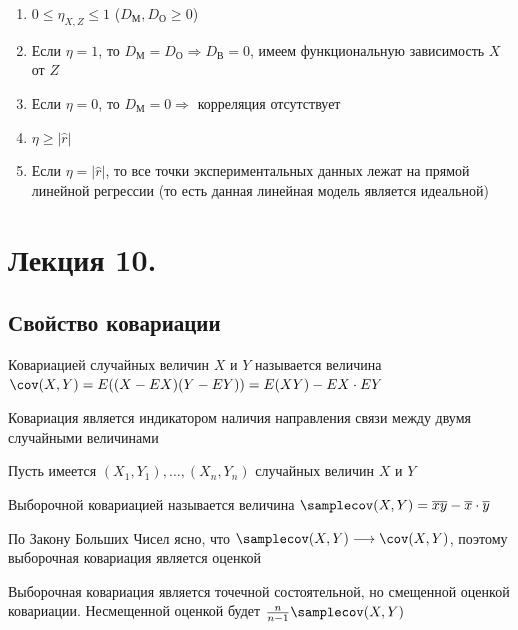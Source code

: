 \documentclass[12pt]{article}
\begin{document}
\begin{enumerate}
    \item $0 \leq \eta_{X, Z} \leq 1$ ($D_\text{М}, D_\text{О} \geq 0$)

    \item Если $\eta = 1$, то $D_\text{М} = D_\text{О} \Longrightarrow D_\text{В} = 0$, имеем функциональную зависимость $X$ от $Z$

    \item Если $\eta = 0$, то $D_\text{М} = 0 \Longrightarrow$ корреляция отсутствует

    \item $\eta \geq |\hat r|$

    \item Если $\eta = |\hat r|$, то все точки экспериментальных данных лежат на прямой линейной регрессии 
    (то есть данная линейная модель является идеальной)

\end{enumerate}







\section{Лекция 10.}

\subsection{Свойство ковариации}

\Mem Ковариацией случайных величин $X$ и $Y$ называется величина $\cov (X, Y) = E((X - EX)(Y - EY)) = E(XY) - EX \cdot EY$

Ковариация является индикатором наличия направления связи между двумя случайными величинами

Пусть имеется $(X_1, Y_1), \dots, (X_n, Y_n)$ случайных величин $X$ и $Y$

\Def Выборочной ковариацией называется величина $\samplecov (X, Y) = \overline{xy} - \overline{x} \cdot \overline{y}$

По Закону Больших Чисел ясно, что $\samplecov (X, Y) \longrightarrow \cov (X, Y)$, поэтому выборочная ковариация является оценкой

\begin{MyTheorem}
    \Ths Выборочная ковариация является точечной состоятельной, но смещенной оценкой ковариации. 
    Несмещенной оценкой будет $\frac{n}{n - 1} \samplecov (X, Y)$
\end{MyTheorem}
\end{document}
